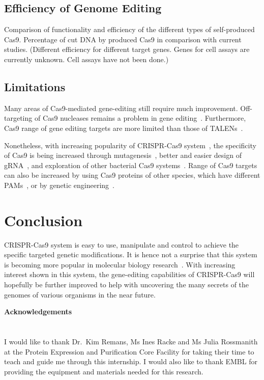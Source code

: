 \documentclass[11pt]{article}
\begin{document}
\subsection{Efficiency of Genome Editing}
Comparison of functionality and efficiency of the different types of self-produced Cas9. Percentage of cut DNA by produced Cas9 in comparison with current studies. (Different efficiency for different target genes. Genes for cell assays are currently unknown. Cell assays have not been done.)

\subsection{Limitations}
Many areas of Cas9-mediated gene-editing still require much improvement. Off-targeting of Cas9 nucleases remains a problem in gene editing~\citep{Cho2014a,Fu2013a,Wu2014b,Mali2013a}. Furthermore, Cas9 range of gene editing targets are more limited than those of TALENs~\citep{Gilles2014,Guilinger2014a}. 

Nonetheless, with increasing popularity of CRISPR-Cas9 system~\citep{Kaur2015}, the specificity of Cas9 is being increased through mutagenesis~\citep{Kleinstiver2016}, better and easier design of gRNA~\citep{Stemmer2015}, and exploration of other bacterial Cas9 systems~\citep{Esvelt2013a}. Range of Cas9 targets can also be increased by using Cas9 proteins of other species, which have different PAMs~\citep{Hou2013a}, or by genetic engineering~\citep{Kleinstiver2015}.


\section{Conclusion}
CRISPR-Cas9 system is easy to use, manipulate and control to achieve the specific targeted genetic modifications. It is hence not a surprise that this system is becoming more popular in molecular biology research~\citep{Sternberg2015}. With increasing interest shown in this system, the gene-editing capabilities of CRISPR-Cas9 will hopefully be further improved to help with uncovering the many secrets of the genomes of various organisms in the near future. 


\newpage 
\vspace*{\fill}
{\huge\bfseries Acknowledgements} \\
\\
\\
\large{I would like to thank Dr.~Kim Remans, Ms Ines Racke and Ms Julia Rossmanith at the Protein Expression and Purification Core Facility for taking their time to teach and guide me through this internship. I would also like to thank EMBL for providing the equipment and materials needed for this research.}
\vfill

\newpage


\end{document}
